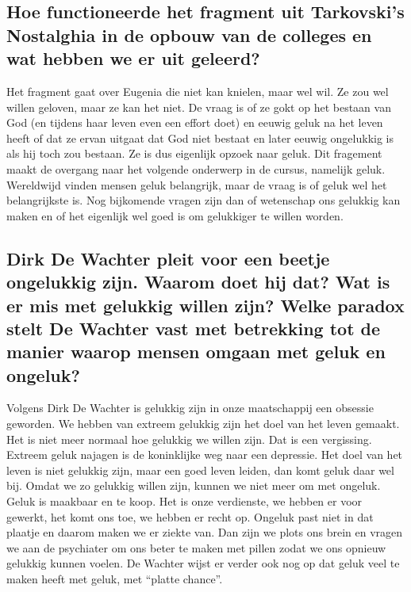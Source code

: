 \documentclass[11pt,a4paper,titlepage]{article}
\begin{document}
\subsection{Hoe functioneerde het fragment uit Tarkovski’s Nostalghia in de opbouw van de colleges en wat hebben we er uit geleerd?}
Het fragment gaat over Eugenia die niet kan knielen, maar wel wil. Ze zou wel willen geloven, maar ze kan het niet. De vraag is of ze gokt op het bestaan van God (en tijdens haar leven even een effort doet) en eeuwig geluk na het leven heeft of dat ze ervan uitgaat dat God niet bestaat en later eeuwig ongelukkig is als hij toch zou bestaan. Ze is dus eigenlijk opzoek naar geluk. Dit fragement maakt de overgang naar het volgende onderwerp in de cursus, namelijk geluk. Wereldwijd vinden mensen geluk belangrijk, maar de vraag is of geluk wel het belangrijkste is. Nog bijkomende vragen zijn dan of wetenschap ons gelukkig kan maken en of het eigenlijk wel goed is om gelukkiger te willen worden.

\subsection{Dirk De Wachter pleit voor een beetje ongelukkig zijn. Waarom doet hij dat? Wat is er mis met gelukkig willen zijn? Welke paradox stelt De Wachter vast met betrekking tot de manier waarop mensen omgaan met geluk en ongeluk? }
Volgens Dirk De Wachter is gelukkig zijn in onze maatschappij een obsessie geworden. We hebben van extreem gelukkig zijn het doel van het leven gemaakt. Het is niet meer normaal hoe gelukkig we willen zijn. Dat is een vergissing. Extreem geluk najagen is de koninklijke weg naar een depressie. Het doel van het leven is niet gelukkig zijn, maar een goed leven leiden, dan komt geluk daar wel bij. Omdat we zo gelukkig willen zijn, kunnen we niet meer om met ongeluk. Geluk is
maakbaar en te koop. Het is onze verdienste, we hebben er voor gewerkt, het komt ons toe, we hebben er recht op. Ongeluk past niet in dat plaatje en daarom maken we er ziekte van. Dan zijn we plots ons brein en vragen we aan de psychiater om ons beter te maken met pillen zodat we ons opnieuw gelukkig kunnen voelen. De Wachter wijst er verder ook nog op dat geluk veel te maken heeft met geluk, met “platte chance”.
\end{document}
